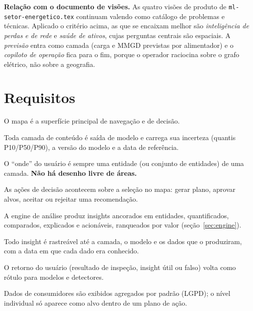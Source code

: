 \documentclass[11pt,a4paper]{article}
\begin{document}
\begin{nota}
\textbf{Relação com o documento de visões.} As quatro visões de produto de
\texttt{ml-setor-energetico.tex} continuam valendo como catálogo de problemas e
técnicas. Aplicado o critério acima, as que se encaixam melhor são
\emph{inteligência de perdas e de rede} e \emph{saúde de ativos}, cujas
perguntas centrais são espaciais. A \emph{previsão} entra como camada (carga e
MMGD previstas por alimentador) e o \emph{copiloto de operação} fica para o
fim, porque o operador raciocina sobre o grafo elétrico, não sobre a geografia.
\end{nota}

\section{Requisitos}

\begin{requisito}
\begin{description}[leftmargin=2.2em,labelwidth=2em,font=\bfseries\color{prodcolor}]
  \item[R1] O mapa é a superfície principal de navegação e de decisão.
  \item[R2] Toda camada de conteúdo é saída de modelo e carrega sua incerteza
    (quantis P10/P50/P90), a versão do modelo e a data de referência.
  \item[R3] O ``onde'' do usuário é sempre uma entidade (ou conjunto de
    entidades) de uma camada. \textbf{Não há desenho livre de áreas.}
  \item[R4] As ações de decisão acontecem sobre a seleção no mapa: gerar
    plano, aprovar alvos, aceitar ou rejeitar uma recomendação.
  \item[R5] A engine de análise produz insights ancorados em entidades,
    quantificados, comparados, explicados e acionáveis, ranqueados por valor
    (seção~\ref{sec:engine}).
  \item[R6] Todo insight é rastreável até a camada, o modelo e os dados que o
    produziram, com a data em que cada dado era conhecido.
  \item[R7] O retorno do usuário (resultado de inspeção, insight útil ou
    falso) volta como rótulo para modelos e detectores.
  \item[R8] Dados de consumidores são exibidos agregados por padrão (LGPD); o
    nível individual só aparece como alvo dentro de um plano de ação.
\end{description}
\end{requisito}
\end{document}
